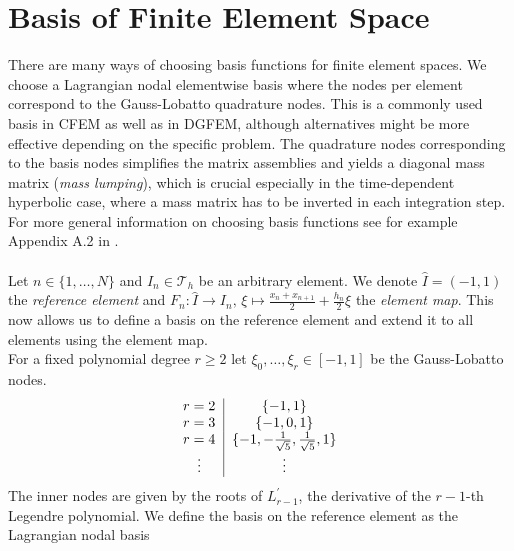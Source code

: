 \section{Basis of Finite Element Space}
\label{sec:ell_basis}
There are many ways of choosing basis functions for finite element spaces. We choose a Lagrangian 
nodal elementwise basis where the nodes per element correspond to the Gauss-Lobatto quadrature nodes.
This is a commonly used basis in CFEM as well as in DGFEM, although alternatives might be more
effective depending on the specific problem. The quadrature nodes
corresponding to the basis nodes simplifies the matrix assemblies and yields a diagonal mass matrix (\textit{mass lumping}), which 
is crucial especially in the time-dependent hyperbolic case, where a mass matrix has to be inverted 
in each integration step. For more general information on choosing basis functions see for example 
Appendix A.2 in \cite{diPietro2012}. \\ \\
Let $n\in \{1,\ldots,N\}$ and $I_n \in \mathcal{T}_h$ be an arbitrary element. 
We denote $\hat{I} = (-1,1)$ the \textit{reference element} and $\displaystyle F_n : \hat{I} \to I_n, \, \xi \mapsto \frac{x_n + x_{n+1}}{2} + \frac{h_n}{2} \xi $
the \textit{element map}. This now allows us to define a basis on the reference element and 
extend it to all elements using the element map. \\
For a fixed polynomial degree $r \geq 2$ let $\xi_0,\ldots,\xi_{r} \in [-1,1]$ be the
Gauss-Lobatto nodes. \\
\begin{equation*}
    \begin{tabular}{c|c}
    \centering
    $r = 2$ & $\{-1, 1\}$ \\
    $r = 3$ & $\{-1,0, 1\}$ \\
    $r = 4$ & $\{-1,-\frac{1}{\sqrt{5}}, \frac{1}{\sqrt{5}}, 1\}$ \\
    \vdots  & \vdots \\
\end{tabular} 
\end{equation*}
The inner nodes are given by the roots of $L_{r-1}^{\prime}$, the derivative of the $r-1$-th Legendre polynomial. 
We define the basis on the reference element as the Lagrangian nodal basis

